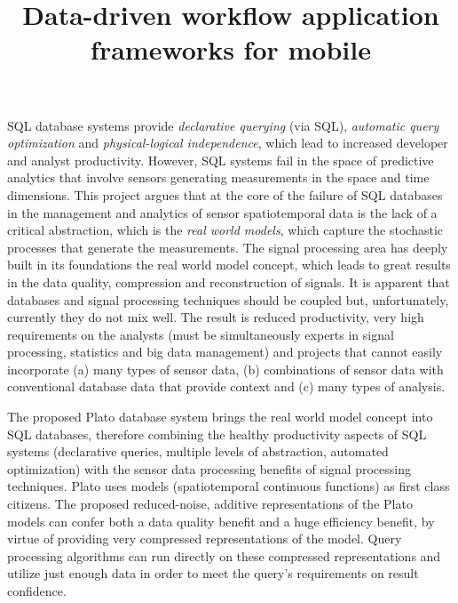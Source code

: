 \documentclass{article}
\title{Data-driven workflow application frameworks for mobile}
\renewcommand{\paragraph}[1]{{\noindent {\bf #1}}}
\begin{document}
\paragraph{Summary} SQL database systems provide {\em declarative querying} (via SQL), {\em automatic query optimization} and {\em physical-logical independence}, which lead to increased developer and analyst productivity. However, SQL systems fail in the space of predictive analytics that involve sensors generating measurements in the space and time dimensions. This project argues that at the core of the failure of SQL databases in the management and analytics of sensor spatiotemporal data is the lack of a critical abstraction, which is the {\em real world models}, which capture the stochastic processes that generate the measurements. The signal processing area has deeply built in its foundations the real world model concept, which leads to great results in the data quality, compression and reconstruction of signals. It is apparent that databases and signal processing techniques should be coupled but, unfortunately, currently they do not mix well. The result is reduced productivity, very high requirements on the analysts (must be simultaneously experts in signal processing, statistics and big data management) and projects that cannot easily incorporate (a) many types of sensor data, (b) combinations of sensor data with conventional database data that provide context and (c) many types of analysis.

The proposed Plato database system brings the real world model concept into SQL databases, therefore combining the healthy productivity aspects of SQL systems (declarative queries, multiple levels of abstraction, automated optimization) with the sensor data processing benefits of signal processing techniques. Plato uses models (spatiotemporal continuous functions) as first class citizens. The proposed reduced-noise, additive representations of the Plato models can confer both a data quality benefit and a huge efficiency benefit, by virtue of providing very compressed representations of the model. Query processing algorithms can run directly on these compressed representations and utilize just enough data in order to meet the query's requirements on result confidence.
\end{document}

